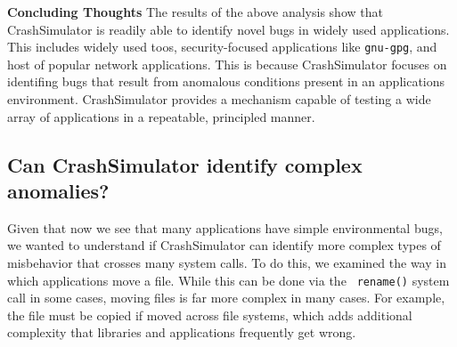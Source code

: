 {\bf Concluding Thoughts}
The results of the above analysis show that CrashSimulator is readily able to
identify novel bugs in widely used applications.  This includes
widely used toos, security-focused applications like {\tt gnu-gpg}, and 
host of popular network applications.  This is
because CrashSimulator focuses on identifing bugs that result from anomalous
conditions present in an applications environment.  CrashSimulator provides
a mechanism capable of testing a wide array of applications in a
repeatable, principled manner.



\subsection{Can CrashSimulator identify complex anomalies?}
\label{sec-complex}


Given that now we see that many applications have simple environmental bugs,
we wanted to understand if CrashSimulator can identify more complex types
of misbehavior that crosses many system calls.  To do this, we examined the
way in which applications move a file.  While this can be done via the {\tt
rename()} system call in some cases, moving files is far more complex in
many cases.  For example, the file must be copied if moved across file
systems, which adds additional complexity that libraries and applications
frequently get wrong.\cite{PHPRenameBug} \cite{PythonShutilBug} \cite{NodejsCopyBug}

